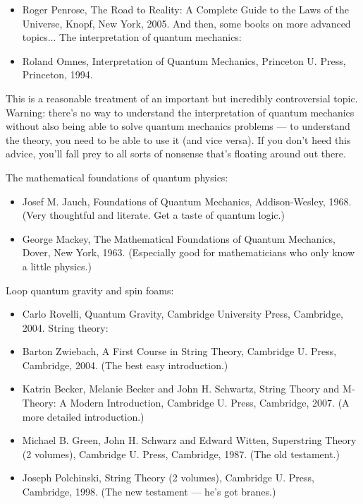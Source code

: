 \documentclass[10pt,a4paper]{book}
\theoremstyle{definition}
\begin{document}
\begin{itemize}
\item  Roger Penrose, The Road to Reality: A Complete Guide to the Laws of the Universe, Knopf, New York, 2005.
And then, some books on more advanced topics...
The interpretation of quantum mechanics:

\item Roland Omnes, Interpretation of Quantum Mechanics, Princeton U. Press, Princeton, 1994.
\end{itemize}

This is a reasonable treatment of an important but incredibly controversial topic. Warning: there's no way to understand the interpretation of quantum mechanics without also being able to solve quantum mechanics problems — to understand the theory, you need to be able to use it (and vice versa). If you don't heed this advice, you'll fall prey to all sorts of nonsense that's floating around out there.

The mathematical foundations of quantum physics:

\begin{itemize}
\item Josef M. Jauch, Foundations of Quantum Mechanics, Addison-Wesley, 1968. (Very thoughtful and literate. Get a taste of quantum logic.)

\item George Mackey, The Mathematical Foundations of Quantum Mechanics, Dover, New York, 1963. (Especially good for mathematicians who only know a little physics.)
\end{itemize}

Loop quantum gravity and spin foams:

\begin{itemize}
\item Carlo Rovelli, Quantum Gravity, Cambridge University Press, Cambridge, 2004.
String theory:

\item Barton Zwiebach, A First Course in String Theory, Cambridge U. Press, Cambridge, 2004. (The best easy introduction.)

\item Katrin Becker, Melanie Becker and John H. Schwartz, String Theory and M-Theory: A Modern Introduction, Cambridge U. Press, Cambridge, 2007. (A more detailed introduction.)

\item Michael B. Green, John H. Schwarz and Edward Witten, Superstring Theory (2 volumes), Cambridge U. Press, Cambridge, 1987. (The old testament.)

\item Joseph Polchinski, String Theory (2 volumes), Cambridge U. Press, Cambridge, 1998. (The new testament — he's got branes.)
\end{itemize}
\end{document}
